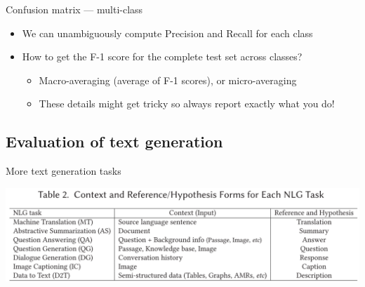 \documentclass[12pt,aspectratio=169,handout]{beamer}
\begin{document}
\begin{frame}{Confusion matrix --- multi-class}

\begin{itemize}
\item We can unambiguously compute Precision and Recall for each class
\item How to get the F-1 score for the complete test set across classes?
\begin{itemize}
\item Macro-averaging (average of F-1 scores), or micro-averaging
\item These details might get tricky so always report exactly what you do!
\end{itemize}

\end{itemize}

\end{frame}















\subsection{Evaluation of text generation}


\begin{frame}{More text generation tasks}

\includegraphics[width=\linewidth]{img/nlg1.png}


\end{frame}
\end{document}
